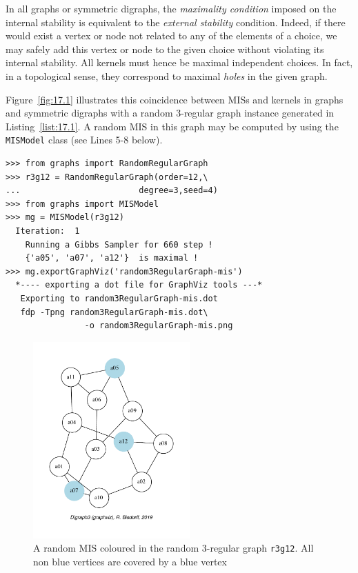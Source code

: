 In all graphs or symmetric digraphs, the \emph{maximality condition} imposed on the internal stability is equivalent to the \emph{external stability} condition. Indeed, if there would exist a vertex or node not related to any of the elements of a choice, we may safely add this vertex or node to the given choice without violating its internal stability. All kernels must hence be maximal independent choices. In fact, in a topological sense, they correspond to maximal \emph{holes} in the given graph.

Figure~\vref{fig:17.1} illustrates this coincidence between MISs and kernels in graphs and symmetric digraphs with a random 3-regular graph instance generated in Listing~\vref{list:17.1}. A random MIS in this graph may be computed by using the \texttt{MISModel} class (see Lines 5-8 below).
\begin{lstlisting}[caption={Generating a random 3-regular graph of order 12},label=list:17.1]
>>> from graphs import RandomRegularGraph
>>> r3g12 = RandomRegularGraph(order=12,\
...                        degree=3,seed=4)
>>> from graphs import MISModel
>>> mg = MISModel(r3g12)
  Iteration:  1
    Running a Gibbs Sampler for 660 step !
    {'a05', 'a07', 'a12'}  is maximal !
>>> mg.exportGraphViz('random3RegularGraph-mis')
  *---- exporting a dot file for GraphViz tools ---*
   Exporting to random3RegularGraph-mis.dot
   fdp -Tpng random3RegularGraph-mis.dot\
                -o random3RegularGraph-mis.png
\end{lstlisting}
\begin{figure}[ht]
\sidecaption[t]
\includegraphics[width=6cm]{Figures/17-1-random3RegularGraph-mis.pdf}
\caption[Coloured MIS in a 3-regular graph]{A random MIS coloured in the random 3-regular graph \texttt{r3g12}. All non blue vertices are covered by a blue vertex}
\label{fig:17.1}       %
\end{figure}

